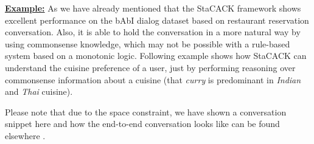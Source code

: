 \documentclass[letterpaper]{article}
\begin{document}
\smallskip 
\noindent\textbf{\underline{Example:}}
As we have already mentioned that the StaCACK framework shows excellent performance on the bAbI dialog dataset based on restaurant reservation conversation. Also, it is able to hold the conversation in a more natural way by using commonsense knowledge, which may not be possible with a rule-based system based on a monotonic logic. Following example shows how StaCACK can understand the cuisine preference of a user, just by performing reasoning over commonsense information about a cuisine (that \textit{curry} is predominant in \textit{Indian} and \textit{Thai} cuisine).

\smallskip 
\noindent
\cprotect {}

\smallskip 
\noindent
 Please note that due to the space constraint, we have shown a conversation snippet here and how the end-to-end conversation looks like can be found elsewhere \cite{babi_dialog}.
\end{document}

